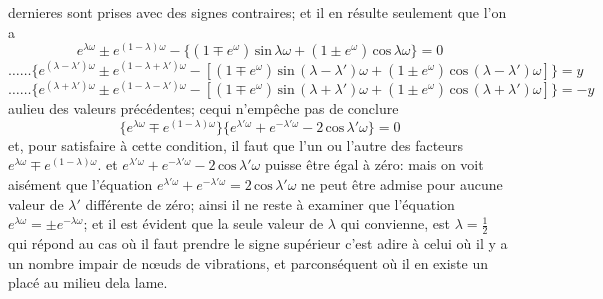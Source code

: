 \documentclass[11pt,a4paper]{article}
\begin{document}

dernieres sont prises avec des signes contraires; et il en résulte seulement que l'on a
\[ e^{\lambda\omega} \pm e^{(1-\lambda)\omega} - \{(1 \mp e^{\omega})\,\text{sin}\,\lambda\omega + (1 \pm e^{\omega})\,\text{cos}\,\lambda\omega\} = 0 \]
\[ \ldots\ldots\{e^{(\lambda-\lambda')\omega} \pm e^{(1-\lambda+\lambda')\omega} - [(1 \mp e^{\omega})\,\text{sin}\,(\lambda-\lambda')\omega + (1 \pm e^{\omega})\,\text{cos}\,(\lambda-\lambda')\omega]\} = y \]
\[ \ldots\ldots\{e^{(\lambda+\lambda')\omega} \pm e^{(1-\lambda-\lambda')\omega} - [(1 \mp e^{\omega})\,\text{sin}\,(\lambda+\lambda')\omega + (1 \pm e^{\omega})\,\text{cos}\,(\lambda+\lambda')\omega]\} = -y \]
aulieu des valeurs précédentes; cequi n'empêche pas de conclure
\[ \{e^{\lambda\omega} \mp e^{(1-\lambda)\omega}\}\{e^{\lambda'\omega} + e^{-\lambda'\omega} - 2\,\text{cos}\,\lambda'\omega\} = 0 \]
et, pour satisfaire à cette condition, il faut que l'un ou l'autre des facteurs
$e^{\lambda\omega} \mp e^{(1-\lambda)\omega}$. et $e^{\lambda'\omega} + e^{-\lambda'\omega} - 2\,\text{cos}\,\lambda'\omega$ puisse être égal à zéro: mais on voit aisément
que l'équation $e^{\lambda'\omega} + e^{-\lambda'\omega} = 2\,\text{cos}\,\lambda'\omega$ ne peut être admise pour aucune valeur
de $\lambda'$ différente de zéro; ainsi il ne reste à examiner que l'équation $e^{\lambda\omega} = \pm e^{-\lambda\omega}$;
et il est évident que la seule valeur de $\lambda$ qui convienne, est $\lambda = \frac{1}{2}$ qui répond
au cas où il faut prendre le signe supérieur c'est adire à celui où il y a un
nombre impair de nœuds de vibrations, et parconséquent où il en existe un placé
au milieu dela lame.
\end{document}
